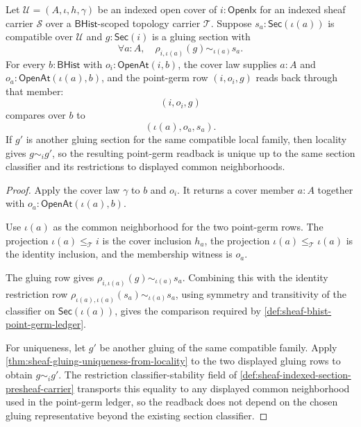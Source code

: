 \begin{theorem}
\label{thm:sheaf-bhist-point-germ-gluing-readback}
Let $\mathcal{U}=(A,\iota,h,\gamma)$ be an indexed open cover of $i:\mathsf{OpenIx}$ for an indexed sheaf carrier $\mathcal{S}$ over a $\mathsf{BHist}$-scoped topology carrier $\mathcal{T}$. Suppose $s_a:\mathsf{Sec}(\iota(a))$ is compatible over $\mathcal{U}$ and $g:\mathsf{Sec}(i)$ is a gluing section with
$$
\forall a:A,\quad \rho_{i,\iota(a)}(g)\sim_{\iota(a)}s_a.
$$
For every $b:\mathsf{BHist}$ with $o_i:\mathsf{OpenAt}(i,b)$, the cover law supplies $a:A$ and $o_a:\mathsf{OpenAt}(\iota(a),b)$, and the point-germ row $(i,o_i,g)$ reads back through that member:
$$
(i,o_i,g)
$$
compares over $b$ to
$$
(\iota(a),o_a,s_a).
$$
If $g'$ is another gluing section for the same compatible local family, then locality gives $g\sim_i g'$, so the resulting point-germ readback is unique up to the same section classifier and its restrictions to displayed common neighborhoods.
\end{theorem}
\begin{proof}
Apply the cover law $\gamma$ to $b$ and $o_i$. It returns a cover member $a:A$ together with $o_a:\mathsf{OpenAt}(\iota(a),b)$.

Use $\iota(a)$ as the common neighborhood for the two point-germ rows. The projection $\iota(a)\le_{\mathcal{T}}i$ is the cover inclusion $h_a$, the projection $\iota(a)\le_{\mathcal{T}}\iota(a)$ is the identity inclusion, and the membership witness is $o_a$.

The gluing row gives $\rho_{i,\iota(a)}(g)\sim_{\iota(a)}s_a$. Combining this with the identity restriction row $\rho_{\iota(a),\iota(a)}(s_a)\sim_{\iota(a)}s_a$, using symmetry and transitivity of the classifier on $\mathsf{Sec}(\iota(a))$, gives the comparison required by \autoref{def:sheaf-bhist-point-germ-ledger}.

For uniqueness, let $g'$ be another gluing of the same compatible family. Apply \autoref{thm:sheaf-gluing-uniqueness-from-locality} to the two displayed gluing rows to obtain $g\sim_i g'$. The restriction classifier-stability field of \autoref{def:sheaf-indexed-section-presheaf-carrier} transports this equality to any displayed common neighborhood used in the point-germ ledger, so the readback does not depend on the chosen gluing representative beyond the existing section classifier.
\end{proof}

